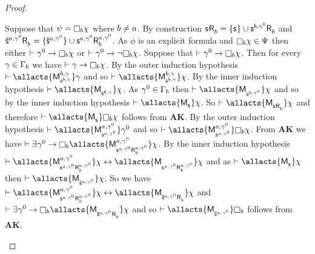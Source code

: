 \begin{proof}
\begin{enumerate}
        Suppose that $\psi = \necessary[\agentB] \chi$ where $b \neq a$. 
        By construction $\aStateS \aAccessibility{\agentB} = \{\aStateS\} \cup \aStateS[\agentB,\gamma^0] \aAccessibility{\agentB}$ and $\aPStateS[\agentA,\gamma^0] \aAccessibility{\agentB} = \{\aPStateS[\agentA,\gamma^0]\} \cup \aStateS[\agentA,\gamma^0] \aAccessibility[\agentA,\gamma^0]{\agentB}$.
        As $\phi$ is an explicit formula and $\necessary[\agentB] \chi \in \Psi$ then either $\proves \gamma^0 \implies \necessary[\agentB] \chi$ or $\proves \gamma^0 \implies \neg \necessary[\agentB] \chi$.
        Suppose that $\proves \gamma^0 \implies \necessary[\agentB] \chi$.
        Then for every $\gamma \in \Gamma_b$ we have $\proves \gamma \implies \necessary[\agentB] \chi$.
        By the outer induction hypothesis $\proves \allacts{\aPModel[\agentB,\gamma]{\aStateS[\agentB,\gamma]}} \gamma$ and so $\proves \allacts{\aPModel[\agentB,\gamma]{\aStateS[\agentB,\gamma]}} \chi$.
        By the inner induction hypothesis $\proves \allacts{\aPModel{\aStateS[\agentB,\gamma]}} \chi$.
        As $\gamma^0 \in \Gamma_b$ then $\proves \allacts{\aPModel{\aStateS[\agentB,\gamma^0]}} \chi$ and so by the inner induction hypothesis $\proves \allacts{\aPModel{\aStateS}} \chi$.
        So $\proves \allacts{\aPModel{\aStateS \aAccessibility{\agentB}}} \chi$ and therefore $\proves \allacts{\aPModel{\aStateS}} \necessary[\agentB] \chi$ follows from {\bf AK}.
        By the outer induction hypothesis $\proves \allacts{\aPModel[\agentA,\gamma^0]{\aStateS[\agentA,\gamma^0]}} \gamma^0$ and so $\proves \allacts{\aPModel[\agentA,\gamma^0]{\aStateS[\agentA,\gamma^0]}} \necessary[\agentB] \chi$.
        From {\bf AK} we have $\proves \somerefs{\gamma^0} \implies \necessary[\agentB] \allacts{\aPModel[\agentA,\gamma^0]{\aStateS[\agentA,\gamma^0] \aAccessibility[\agentA,\gamma^0]{\agentB}}} \chi$.
        By the inner induction hypothesis $\proves \allacts{\aPModel[\agentA,\gamma^0]{\aStateS[\agentA,\gamma^0] \aAccessibility[\agentA,\gamma^0]{\agentB}}} \chi \iff \allacts{\aPModel{\aStateS[\agentA,\gamma^0] \aAccessibility[\agentA,\gamma^0]{\agentB}}} \chi$ and as $\proves \allacts{\aPModel{\aStateS}} \chi$ then $\proves \allacts{\aPModel{\aPStateS[\agentA,\gamma^0]}} \chi$.
        So we have $\proves \allacts{\aPModel[\agentA,\gamma^0]{\aStateS[\agentA,\gamma^0] \aAccessibility[\agentA,\gamma^0]{\agentB}}} \chi \iff \allacts{\aPModel{\aPStateS[\agentA,\gamma^0] \aAccessibility{\agentB}}} \chi$ and $\proves \somerefs{\gamma^0} \implies \necessary[\agentB] \allacts{\aPModel{\aPStateS[\agentA,\gamma^0] \aAccessibility{\agentB}}} \chi$ and so $\proves \allacts{\aPModel{\aPStateS[\agentA,\gamma^0]}} \necessary[\agentB]$ follows from {\bf AK}.

\end{enumerate}
\end{proof}
